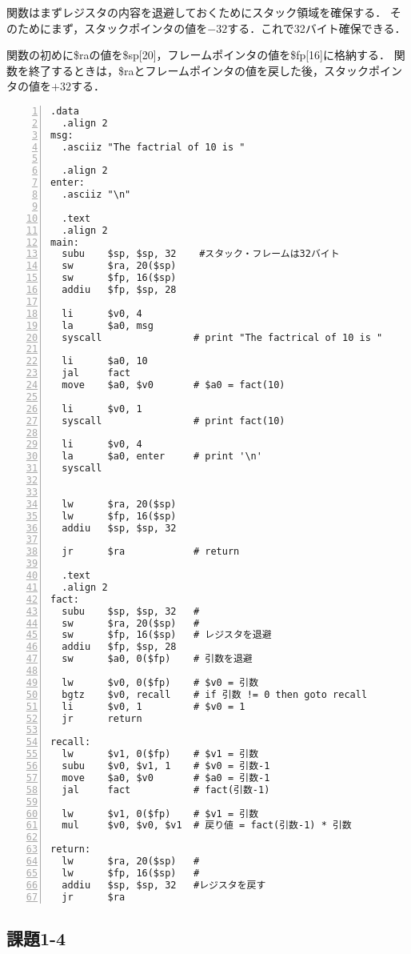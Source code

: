\documentclass[11pt]{jarticle}
\begin{document}
関数はまずレジスタの内容を退避しておくためにスタック領域を確保する．
そのためにまず，スタックポインタの値を$-32$する．これで32バイト確保できる．

関数の初めに\$raの値を\$sp[20]，フレームポインタの値を\$fp[16]に格納する．
関数を終了するときは，\$raとフレームポインタの値を戻した後，スタックポインタの値を$+32$する．

\begin{lstlisting}[caption=fact関数,label=fact関数,numbers=left]
  .data
  .align 2
msg:
  .asciiz "The factrial of 10 is "

  .align 2
enter:
  .asciiz "\n"
  
  .text
  .align 2
main:
  subu    $sp, $sp, 32    #スタック・フレームは32バイト
  sw      $ra, 20($sp)    
  sw      $fp, 16($sp)
  addiu   $fp, $sp, 28
  
  li      $v0, 4     
  la      $a0, msg
  syscall                # print "The factrical of 10 is "

  li      $a0, 10
  jal     fact
  move    $a0, $v0       # $a0 = fact(10)

  li      $v0, 1         
  syscall                # print fact(10)
  
  li      $v0, 4        
  la      $a0, enter     # print '\n'
  syscall

  
  lw      $ra, 20($sp)
  lw      $fp, 16($sp)
  addiu   $sp, $sp, 32
  
  jr      $ra            # return

  .text
  .align 2
fact:
  subu    $sp, $sp, 32   #
  sw      $ra, 20($sp)   #
  sw      $fp, 16($sp)   # レジスタを退避
  addiu   $fp, $sp, 28
  sw      $a0, 0($fp)    # 引数を退避

  lw      $v0, 0($fp)    # $v0 = 引数
  bgtz    $v0, recall    # if 引数 != 0 then goto recall
  li      $v0, 1         # $v0 = 1
  jr      return
  
recall:
  lw      $v1, 0($fp)    # $v1 = 引数
  subu    $v0, $v1, 1    # $v0 = 引数-1
  move    $a0, $v0       # $a0 = 引数-1
  jal     fact           # fact(引数-1)

  lw      $v1, 0($fp)    # $v1 = 引数
  mul     $v0, $v0, $v1  # 戻り値 = fact(引数-1) * 引数
  
return: 
  lw      $ra, 20($sp)   #
  lw      $fp, 16($sp)   #
  addiu   $sp, $sp, 32   #レジスタを戻す
  jr      $ra
\end{lstlisting}

\subsection{課題1-4}
\end{document}
